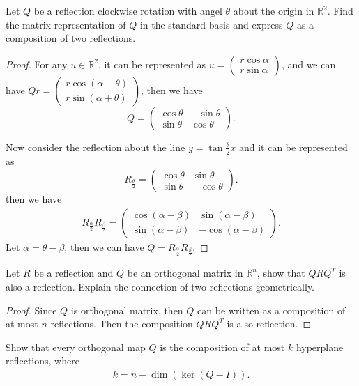 \documentclass[12pt]{article}
\begin{document}
Let $Q$ be a reflection clockwise rotation with angel $\theta$ about the origin in $\mathbb{R}^2$. Find the matrix representation of $Q$ in the standard basis and express $Q$ as a composition of two reflections.
\begin{proof}
For any $u\in\mathbb{R}^2$, it can be represented as $u = \begin{pmatrix} 
    r \cos \alpha \\
    r \sin\alpha  
\end{pmatrix}$, and we can have $Qr = \begin{pmatrix} 
    r \cos (\alpha+\theta) \\
    r \sin (\alpha+\theta)  
\end{pmatrix}$, then we have 
$$Q = \begin{pmatrix} 
    \cos \theta & - \sin \theta \\
    \sin \theta & \cos \theta  
\end{pmatrix}.$$

Now consider the reflection about the line $y = \tan \frac{\theta}{2} x$ and it can be represented as 
$$R_{\frac{\theta}{2}} = \begin{pmatrix} 
    \cos \theta & \sin \theta \\
    \sin \theta & - \cos \theta  
\end{pmatrix}.$$
then we have 
\begin{align*}
    R_{\frac{\alpha}{2}} R_{\frac{\beta}{2}} = \begin{pmatrix} 
    \cos (\alpha - \beta) & \sin (\alpha - \beta) \\
    \sin (\alpha - \beta) & - \cos (\alpha - \beta)  
\end{pmatrix}.
\end{align*}
Let $\alpha = \theta - \beta$, then we can have $Q = R_{\frac{\alpha}{2}} R_{\frac{\beta}{2}}$.
\end{proof}

\medskip

Let $R$ be a reflection and $Q$ be an orthogonal matrix in $\mathbb{R}^n$, show that $QRQ^T$ is also a reflection. Explain the connection of two reflections geometrically.
\begin{proof}
Since $Q$ is orthogonal matrix, then $Q$ can be written as a composition of at most $n$ reflections. Then the composition $QRQ^T$ is also reflection.
\end{proof}

\medskip

Show that every orthogonal map $Q$ is the composition of at most $k$ hyperplane reflections, where
\begin{align*}
    k = n - \dim (\ker(Q - I)).
\end{align*}
\end{document}
